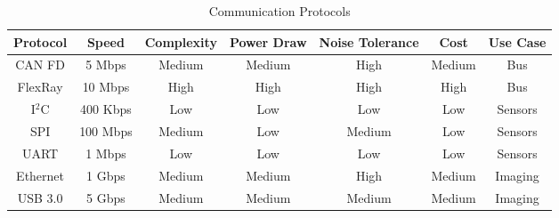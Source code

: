 \begin{table}[h]
\centering
\begin{tabular}{|c|c|c|c|c|c|c|} 
\hline
\textbf{Protocol} & \textbf{Speed} & \textbf{Complexity} & \textbf{Power Draw} & \textbf{Noise Tolerance} & \textbf{Cost} & \textbf{Use Case} \\ 
\hline 
CAN FD & 5 Mbps & Medium & Medium & High & Medium & Bus \\ 
FlexRay & 10 Mbps & High & High & High & High & Bus \\ 
I$^2$C & 400 Kbps & Low & Low & Low & Low & Sensors \\ 
SPI & 100 Mbps & Medium & Low & Medium & Low & Sensors \\ 
UART & 1 Mbps & Low & Low & Low & Low & Sensors \\ 
Ethernet & 1 Gbps & Medium & Medium & High & Medium & Imaging \\ 
USB 3.0 & 5 Gbps & Medium & Medium & Medium & Medium & Imaging \\ 
\hline 
\end{tabular}
\caption{Communication Protocols}
\label{tab:communication_options}
\end{table}